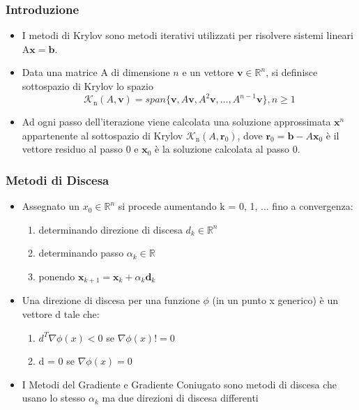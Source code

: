 \documentclass[10pt]{beamer}
\begin{document}
\begin{frame} \frametitle{Introduzione}
\begin{itemize}
    \item I metodi di Krylov sono metodi iterativi utilizzati per risolvere sistemi lineari A$\mathbf{x}=\mathbf{b}$.

    \item Data una matrice A di dimensione $\mathit{n}$ e un vettore $\mathbf{v}\in \mathbb{R}^n$, si definisce \alert{sottospazio di Krylov} lo spazio
    $$
    \mathcal{K}_\mathrm{n}(A,\mathbf{v})=span\{\mathbf{v},A\mathbf{v},A^2\mathbf{v},\dots,A^{n-1}\mathbf{v}\}, n\geq1
    $$

    \item Ad ogni passo dell'iterazione viene calcolata una soluzione approssimata $\mathbf{x}^\mathit{n}$ appartenente al sottospazio di Krylov $\mathcal{K}_\mathrm{n}(A,\mathbf{r}_0)$, dove $\mathbf{r}_0=\mathbf{b}-A\mathbf{x}_0$ è il vettore residuo al passo 0 e $\mathbf{x}_0$ è la soluzione calcolata al passo 0.
    
\end{itemize}
\end{frame}

\begin{frame} \frametitle{Metodi di Discesa}
\begin{itemize}
    \item Assegnato un $x_0\in \mathbb{R}^n$ si procede aumentando k = 0, 1, ... fino a convergenza:
    \begin{enumerate}
        \item determinando direzione di discesa $d_k \in \mathbb{R}^n$
        \item determinando passo $\alpha_k\in \mathbb{R}$
        \item ponendo $\mathbf{x}_{k+1}=\mathbf{x}_{k}+\alpha_k\mathbf{d}_{k}$
    \end{enumerate}
    \item Una direzione di discesa per una funzione $\phi$ (in un punto x generico) è un vettore d tale che:
    \begin{enumerate}
        \item $d^T\nabla\phi(x) < 0$ se $\nabla\phi(x)  != 0$
        \item d = 0      se $\nabla\phi(x) = 0$
    \end{enumerate}
    \item I Metodi del Gradiente e Gradiente Coniugato sono metodi di discesa che usano lo stesso $\alpha_k$ ma due direzioni di discesa differenti
\end{itemize}
\end{frame}
\end{document}
